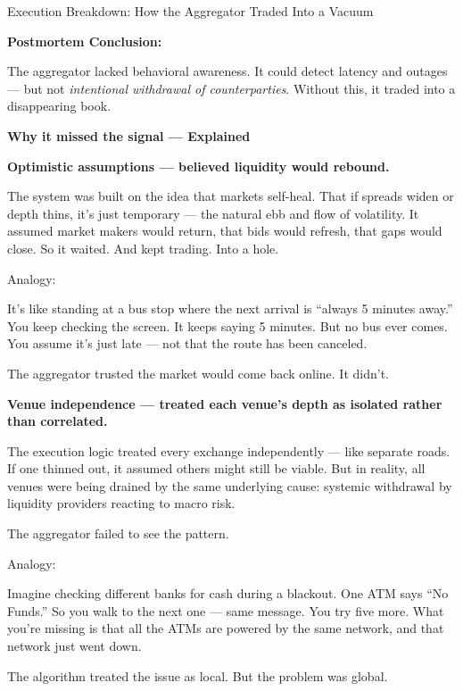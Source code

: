 \begin{TechnicalSidebar}{Execution Breakdown: How the Aggregator Traded Into a Vacuum}
  \vspace{0.5em}
  
  \textbf{Postmortem Conclusion:}
  
  The aggregator lacked behavioral awareness. It could detect latency and outages — but not \textit{intentional 
  withdrawal of counterparties}. Without this, it traded into a disappearing book.
  
\end{TechnicalSidebar}
  





\textbf{Why it missed the signal — Explained}

\textbf{Optimistic assumptions — believed liquidity would rebound.}

The system was built on the idea that markets self-heal. That if spreads widen or depth thins, it’s just temporary — 
the natural ebb and flow of volatility. It assumed market makers would return, that bids would refresh, that gaps would 
close. So it waited. And kept trading. Into a hole.

Analogy:

It’s like standing at a bus stop where the next arrival is “always 5 minutes away.” You keep checking the screen. It 
keeps saying 5 minutes. But no bus ever comes. You assume it’s just late — not that the route has been canceled.

The aggregator trusted the market would come back online. It didn’t.


\textbf{Venue independence — treated each venue’s depth as isolated rather than correlated.}

The execution logic treated every exchange independently — like separate roads. If one thinned out, it assumed others 
might still be viable. But in reality, all venues were being drained by the same underlying cause: systemic withdrawal 
by liquidity providers reacting to macro risk.

The aggregator failed to see the pattern.

Analogy:

Imagine checking different banks for cash during a blackout. One ATM says “No Funds.” So you walk to the next one 
— same message. You try five more. What you’re missing is that all the ATMs are powered by the same network, and that 
network just went down.

The algorithm treated the issue as local. But the problem was global.


